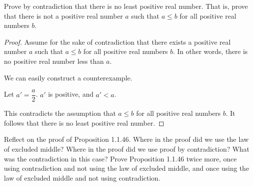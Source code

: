 \begin{exercise}
\label{exNoLeastPositiveReal}
Prove by contradiction that there is no least positive real number. That is, prove that there is not a positive real number $a$ such that $a \le b$ for all positive real numbers $b$.
\end{exercise}

\begin{solutions*}
    \fixlistskip
    \begin{proof}
    Assume for the sake of contradiction that there exists a positive real number $a$ such that $a \le b$ for all positive real numbers $b$. In other words, there is no positive real number less than $a$.

    We can easily construct a counterexample.

    Let $a' = \dfrac{a}{2}$. $a'$ is positive, and $a' < a$. 

    This contradicts the assumption that $a \le b$ for all positive real numbers $b$. It follows that there is no least positive real number.
    \end{proof}
\end{solutions*}

\begin{exercise}
Reflect on the proof of Proposition 1.1.46. Where in the proof did we use the law of excluded middle? Where in the proof did we use proof by contradiction? What was the contradiction in this case? Prove Proposition 1.1.46 twice more, once using contradiction and not using the law of excluded middle, and once using the law of excluded middle and not using contradiction.
\end{exercise}

